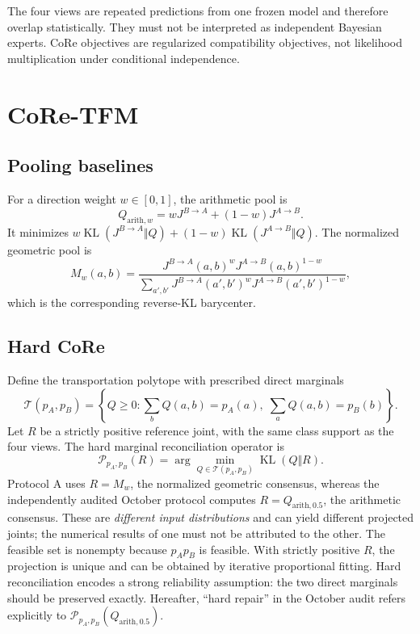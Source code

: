 \documentclass[a4paper,fleqn]{cas-sc}
\newcommand{\KL}{\operatorname{KL}}
\newcommand{\Jone}{J^{B\rightarrow A}}
\newcommand{\Jtwo}{J^{A\rightarrow B}}
\begin{document}
The four views are repeated predictions from one frozen model and therefore overlap statistically. They must not be interpreted as independent Bayesian experts. CoRe objectives are regularized compatibility objectives, not likelihood multiplication under conditional independence.

\section{CoRe-TFM}
\subsection{Pooling baselines}
For a direction weight $w\in[0,1]$, the arithmetic pool is
\begin{equation}
Q_{\mathrm{arith},w}=w\Jone+(1-w)\Jtwo.
\end{equation}
It minimizes $w\KL(\Jone\Vert Q)+(1-w)\KL(\Jtwo\Vert Q)$. The normalized geometric pool is
\begin{equation}
M_w(a,b)=\frac{\Jone(a,b)^w\Jtwo(a,b)^{1-w}}
{\sum_{a',b'}\Jone(a',b')^w\Jtwo(a',b')^{1-w}},
\end{equation}
which is the corresponding reverse-KL barycenter.

\subsection{Hard CoRe}
Define the transportation polytope with prescribed direct marginals
\begin{equation}
\mathcal{T}(p_A,p_B)=\left\{Q\ge0:\sum_bQ(a,b)=p_A(a),\;\sum_aQ(a,b)=p_B(b)\right\}.
\end{equation}
Let $R$ be a strictly positive reference joint, with the same class support as the four views. The hard marginal reconciliation operator is
\begin{equation}
\label{eq:hard-general}
\mathcal{P}_{p_A,p_B}(R)=\arg\min_{Q\in\mathcal{T}(p_A,p_B)}\KL(Q\Vert R).
\end{equation}
Protocol A uses $R=M_w$, the normalized geometric consensus, whereas the independently audited October protocol computes $R=Q_{\mathrm{arith},0.5}$, the arithmetic consensus. These are \emph{different input distributions} and can yield different projected joints; the numerical results of one must not be attributed to the other. The feasible set is nonempty because $p_Ap_B$ is feasible. With strictly positive $R$, the projection is unique and can be obtained by iterative proportional fitting. Hard reconciliation encodes a strong reliability assumption: the two direct marginals should be preserved exactly. Hereafter, ``hard repair'' in the October audit refers explicitly to $\mathcal{P}_{p_A,p_B}(Q_{\mathrm{arith},0.5})$.
\end{document}
